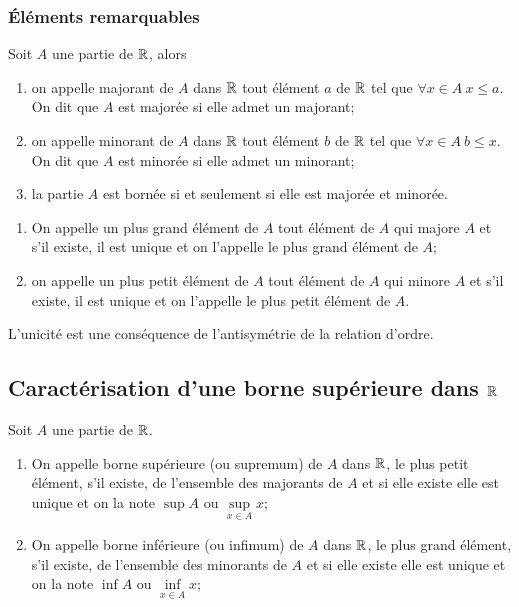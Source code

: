 \subsubsection{Éléments remarquables}

Soit \(A\) une partie de \(\mathbb{R}\), alors
\begin{defdef}
  \begin{enumerate}
    \item on appelle majorant de \(A\) dans \(\mathbb{R}\) tout élément \(a\) de \(\mathbb{R}\) 
      tel que \(\forall x \in A \ x\leqslant a\). On dit que \(A\) est majorée 
      si elle admet un majorant;
    \item on appelle minorant de \(A\) dans \(\mathbb{R}\) tout élément \(b\) de \(\mathbb{R}\) 
      tel que \(\forall x \in A \ b\leqslant x\). On dit que \(A\) est minorée 
      si elle admet un minorant;
    \item la partie \(A\) est bornée si et seulement si elle est majorée et 
      minorée.
  \end{enumerate}
\end{defdef}

\begin{defdef}
  \begin{enumerate}
    \item On appelle un plus grand élément de \(A\) tout élément de \(A\) qui 
      majore \(A\) et s'il existe, il est unique et on l'appelle le plus grand 
      élément de \(A\);
    \item on appelle un plus petit élément de \(A\) tout élément de \(A\) qui 
      minore \(A\) et s'il existe, il est unique et on l'appelle le plus petit 
      élément de \(A\).
  \end{enumerate}
\end{defdef}
L'unicité est une conséquence de l'antisymétrie de la relation d'ordre.

\subsection{Caractérisation d'une borne supérieure dans \(\mathbb{R}\)}

Soit \(A\) une partie de \(\mathbb{R}\).
\begin{defdef}
  \begin{enumerate}
    \item On appelle borne supérieure (ou supremum) de \(A\) dans \(\mathbb{R}\), le 
      plus petit élément, s'il existe, de l'ensemble des majorants de \(A\) et 
      si elle existe elle est unique et on la note \(\sup A\) ou 
      \(\sup\limits_{x\in A} x\);
    \item On appelle borne inférieure (ou infimum) de \(A\) dans \(\mathbb{R}\), le plus 
      grand élément, s'il existe, de l'ensemble des minorants de \(A\) et si 
      elle existe elle est unique et on la note \(\inf A\) ou 
      \(\inf\limits_{x\in A} x\);
  \end{enumerate}
\end{defdef}

